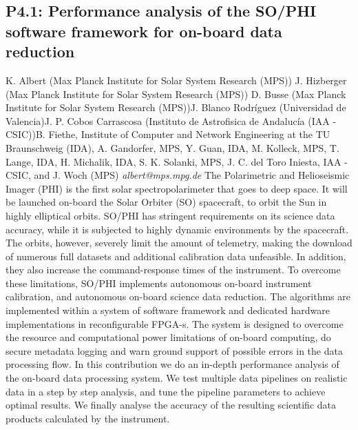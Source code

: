 \documentclass{report}
\begin{document}
\subsection*{P4.1: Performance analysis of the SO/PHI software framework for on-board data reduction}
\bigskip
K. Albert (Max Planck Institute for Solar System Research (MPS)) \newline J. Hizberger (Max Planck Institute for Solar System Research (MPS)) \newline  D. Busse (Max Planck Institute for Solar System Research (MPS))\newline  J. Blanco Rodríguez (Universidad de Valencia)\newline J. P. Cobos Carrascosa (Instituto de Astrofisica de Andalucía (IAA - CSIC))\newline  B. Fiethe, Institute of Computer and Network Engineering at the TU Braunschweig (IDA), A. Gandorfer, MPS, Y. Guan, IDA, M. Kolleck, MPS, T. Lange, IDA, H. Michalik, IDA, S. K. Solanki, MPS, J. C. del Toro Iniesta, IAA - CSIC, and J. Woch (MPS)\newline\newline
{\it albert@mps.mpg.de}\newline
\newline\newline
The Polarimetric and Helioseismic Imager (PHI) is the first solar spectropolarimeter that goes to deep space. It will be launched on-board the Solar Orbiter (SO) spacecraft, to orbit the Sun in highly elliptical orbits. SO/PHI has stringent requirements on its science data accuracy, while it is subjected to highly dynamic environments by the spacecraft. The orbits, however, severely limit the amount of telemetry, making the download of numerous full datasets and additional calibration data unfeasible. In addition, they also increase the command-response times of the instrument.
To overcome these limitations, SO/PHI implements autonomous on-board instrument calibration, and autonomous on-board science data reduction. The algorithms are implemented within a system of software framework and dedicated hardware implementations in reconfigurable FPGA-s. The system is designed to overcome the resource and computational power limitations of on-board computing, do secure metadata logging and warn ground support of possible errors in the data processing flow.
In this contribution we do an in-depth performance analysis of the on-board data processing system. We test multiple data pipelines on realistic data in a step by step analysis, and tune the pipeline parameters to achieve optimal results. We finally analyse the accuracy of the resulting scientific data products calculated by the instrument.\newline
\newpage
\end{document}
